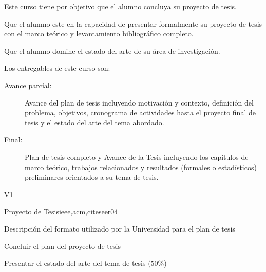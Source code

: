 \begin{syllabus}


\begin{justification}
Este curso tiene por objetivo que el alumno concluya su proyecto de tesis.
\end{justification}

\begin{goals}
\item Que el alumno este en la capacidad de presentar formalmente su proyecto de tesis con el marco teórico y levantamiento bibliográfico completo.
\item Que el alumno domine el estado del arte de su área de investigación.
\item Los entregables de este curso son:
	\begin{description}
	\item [Avance parcial:] Avance del plan de tesis incluyendo motivación y contexto, definición del problema, objetivos, cronograma de actividades hasta el proyecto final de tesis y el estado del arte del tema abordado.
	\item [Final:] Plan de tesis completo y Avance de la Tesis incluyendo los capítulos de marco teórico, trabajos relacionados y resultados (formales o estadísticos) preliminares orientados a su tema de tesis.
	\end{description}
\end{goals}

\begin{outcomes}{V1}
\end{outcomes}

\begin{unit}{Proyecto de Tesis}{ieee,acm,citeseer}{0}{4}
\begin{unitgoals}
      \item Descripción del formato utilizado por la Universidad para el plan de tesis 
      \item Concluir el plan del proyecto de tesis
      \item Presentar el estado del arte del tema de tesis (50\%)
   \end{unitgoals}
\end{unit}


\end{syllabus}
